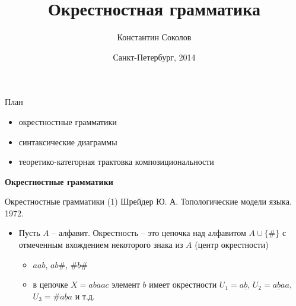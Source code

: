 \documentclass{beamer}
\begin{document}
\title{\Large{Окрестностная грамматика}}
\author{Константин Соколов}
\date{Санкт-Петербург, 2014} 
\begin{frame}
    \thispagestyle{empty}
    \titlepage
\end{frame}

\begin{frame}{План}
\setcounter{framenumber}{1}
    \begin{itemize}
		\item окрестностные грамматики
		\item синтаксические диаграммы
		\item теоретико-категорная трактовка композициональности
    \end{itemize}
\end{frame}



\begin{frame}{}
\begin{center}
	\textbf{Окрестностные грамматики}
\end{center}
\end{frame}

\begin{frame}{Окрестностные грамматики (1)}
Шрейдер Ю. А. Топологические модели языка. 1972.\\
\medskip
\begin{small}
\begin{itemize}
	\item Пусть $A$ -- алфавит. Окрестность -- это цепочка над алфавитом $A \cup \{ \# \}$ с отмеченным вхождением некоторого знака из $A$ (центр окрестности)
		\begin{itemize}
			\item $a\underline{a}b$, $\underline{a}b\#$, $\#\underline{b}\#$
			\item в цепочке $X = abaac$ элемент $b$ имеет окрестности $U_1 = a\underline{b}$, $U_2 = a\underline{b}aa$, $U_3 = \#a\underline{b}a$ и т.д.
		\end{itemize}
\end{itemize}
\end{small}
\end{frame}
\end{document}
